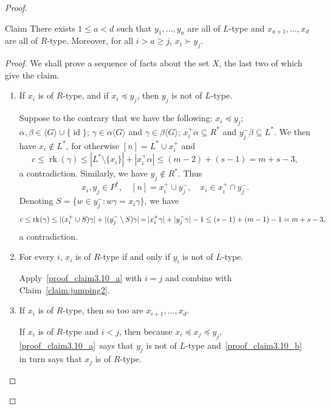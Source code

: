 \documentclass[ALCO,ThmDefs,Unicode,epreuves]{cedram}
\DeclareMathOperator{\rk}{rk}
\DeclareMathOperator{\id}{id}
\newcommand{\genset}[1]{\langle#1\rangle}
\newcommand{\nset}{[n]}
\newenvironment{claim}{\begin{enonce}{Claim}}{\end{enonce}}
\newcommand*{\Mk}{\mkern -2mu}
\begin{document}
\begin{proof}
\begin{claim} \label{claim:jumping3}
 There exists $1 \le a < d$ such that $y_1, \dots, y_a$ are all of $L$-type
 and $x_{a+1}, \dots, x_d$ are all of $R$-type. Moreover, for all $i > a \ge
 j$, $x_i \succ y_j$.
\end{claim}

\begin{proof} 
 We shall prove a sequence of facts about the set $X$, the last two of which give the claim.

\begin{enumerate}[(\alph*)]
 \item\label{proof_claim3.10_a} 
 If $x_i$ is of $R$-type, and if $x_i \preceq y_j$, then $y_j$
 is not of $L$-type.

 Suppose to the contrary that we have the following: $x_i \preceq
 y_j$; $\alpha, \beta \in \genset{G} \cup \{ \id \}$; $\gamma \in \alpha
 \genset{G}$ and $\gamma \in \beta \genset{G}$; $x_i^+ \alpha \subseteq R^*$
 and $y_j^- \beta \subseteq L^*$. We then have $x_i \notin L^*$, for otherwise
 $\nset = L^* \cup x_i^+$ and \[ c \le \rk(\gamma) \le |L^*
 \setminus \{ x_i \}| + |x_i^+ \alpha| \le (m-2) + (s-1) = m + s - 3, \] a
 contradiction. Similarly, we have $y_j \notin R^*$. Thus 
 \[ x_i, y_j \in P^*, \quad \nset = x_i^+ \cup y_j^-, \quad x_i \in
 x_i^+ \cap y_j^-. \] 
 Denoting $S = \{ w \in y_j^- : w \gamma= x_i \gamma \}$, we have \[ c \le
 \rk(\gamma) \le |(x_i^+ \cup S) \gamma| + |(y_j^- \setminus S) \gamma| \Mk =\Mk 
 |x_i^+ \gamma| + |y_j^- \gamma| - 1 \le (s-1) + (m-1) - 1 = m + s - 3, \] a
 contradiction.

 \item\label{proof_claim3.10_b} 
 For every $i$, $x_i$ is of $R$-type if and only if $y_i$ is not of $L$-type.

Apply~\ref{proof_claim3.10_a} with $i=j$ and combine with Claim~\ref{claim:jumping2}.

 \item\label{proof_claim3.10_c} 
 If $x_i$ is of $R$-type, then so too are $x_{i+1},\ldots,x_d$.

If $x_i$ is of $R$-type and $i < j$, then because $x_i\preceq x_j\preceq y_j$, \ref{proof_claim3.10_a}~says that $y_j$ is not of $L$-type and~\ref{proof_claim3.10_b} in turn says that $x_j$ is of $R$-type.


\end{enumerate}
\end{proof}
\end{proof}
\end{document}
